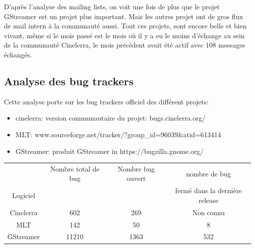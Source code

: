 D'après l'analyse des mailing lists, on voit une fois de plus que le
projet GStreamer est un projet plus important. Mais les autres projet ont
de gros flux de mail intern à la communauté aussi. Tout ces projets,
sont encore belle et bien vivant, même si le mois passé est le mois
où il y a eu le moins d'échange au sein de la communauté Cinelerra,
le mois précédent avait été actif avec 108 messages échangés.

\subsection {Analyse des bug trackers}

Cette analyse porte sur les bug trackers officiel des différent projets:

\begin{itemize}

  \item {cinelerra: version communautaire du projet:
    bugs.cinelerra.org/}

  \item {MLT:
  www.sourceforge.net/tracker/?group\_id=96039\&atid=613414}

  \item {GStreamer: produit GStreamer in https://bugzilla.gnome.org/}

\end{itemize}


\begin{center}

  \begin{tabular}{ | c | c | c | c|}

    \hline

         & Nombre total de bug & Nombre bug ouvert & nombre de bug \\

Logiciel &        & & fermé dans la dernière release \\

\hline \hline

Cinelerra & 602 & 269 & Non connu \\

\hline

MLT\index{MLT} & 142 & 50 & 8 \\

\hline

GStreamer & 11210 & 1363 &  532\\

\hline

  \end{tabular}

\end{center}

